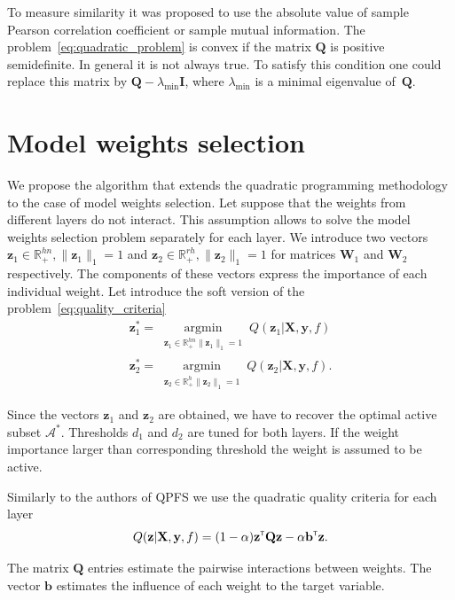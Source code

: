 \documentclass[a4paper,12pt]{article}
\theoremstyle{plain} %
\theoremstyle{definition} %
\theoremstyle{remark} %
\newcommand{\bb}{\mathbf{b}}
\newcommand{\bQ}{\mathbf{Q}}
\newcommand{\bW}{\mathbf{W}}
\newcommand{\by}{\mathbf{y}}
\newcommand{\bz}{\mathbf{z}}
\newcommand{\bX}{\mathbf{X}}
\newcommand{\cA}{\mathcal{A}}
\newcommand{\bbR}{\mathbb{R}}
\newcommand{\T}{{\text{\tiny\sffamily\upshape\mdseries T}}}
\newcommand{\argmin}{\mathop{\arg \min}\limits}
\begin{document}
  	To measure similarity it was proposed to use the absolute value of sample Pearson correlation coefficient or sample mutual information.
  	The problem~\ref{eq:quadratic_problem} is convex if the matrix $\bQ$ is positive semidefinite. In general it is not always true. To satisfy this condition one could replace this matrix by $\bQ - \lambda_{\text{min}} \mathbf{I}$, where $\lambda_{\text{min}} $ is a minimal eigenvalue of~$\bQ$.
  	  	
  	\section*{Model weights selection}
  	
	We propose the algorithm that extends the quadratic programming methodology to the case of model weights selection.
	Let suppose that the weights from different layers do not interact. 
	This assumption allows to solve the model weights selection problem separately for each layer.
	We introduce two vectors $\bz_1 \in \bbR^{hn}_{+}, \|\bz_1\|_1 = 1$ and $\bz_2 \in \bbR^{rh}_{+}, \|\bz_2\|_1 = 1$ for matrices $\bW_1$ and $\bW_2$ respectively. 
	The components of these vectors express the importance of each individual weight.
	Let introduce the soft version of the problem~\ref{eq:quality_criteria}
	\begin{align}
		\bz_1^* = \argmin_{\substack{\bz_1 \in \bbR^{hn}_{+} \| \bz_1 \|_1 = 1}} Q(\bz_1 | \bX, \by, f) 
		\label{eq:soft_quality_criteria1}\\
		\bz_2^* = \argmin_{\substack{ \bz_2 \in \bbR^{h}_{+} \| \bz_2 \|_1 = 1}} Q(\bz_2 | \bX, \by, f) .
		\label{eq:soft_quality_criteria2}
	\end{align}

	Since the vectors $\bz_1$ and $\bz_2$ are obtained, we have to recover the optimal active subset $\cA^*$. 
	Thresholds $d_1$ and $d_2$ are tuned for both layers. If the weight importance larger than corresponding threshold the weight is assumed to be active.
	
	Similarly to the authors of QPFS we use the quadratic quality criteria for each layer
	\begin{equation}
		Q(\bz | \bX, \by, f) = (1 - \alpha) \bz^{\T} \bQ\bz - \alpha \mathbf{b}^{\T} \bz.
	\end{equation}
	
	The matrix $\bQ$ entries estimate the pairwise interactions between weights. The vector $\bb$ estimates the influence of each weight to the target variable.
	
\end{document}
